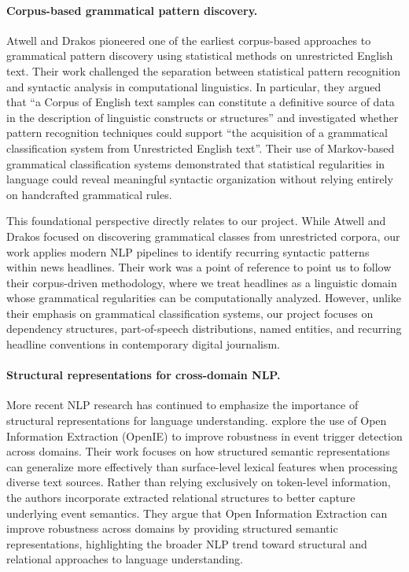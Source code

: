 \documentclass[11pt]{article}
\begin{document}
\paragraph{Corpus-based grammatical pattern discovery.} Atwell and Drakos pioneered one of the earliest corpus-based approaches to grammatical pattern discovery using statistical methods on unrestricted English text. Their work challenged the separation between statistical pattern recognition and syntactic analysis in computational linguistics. In particular, they argued that ``a Corpus of English text samples can constitute a definitive source of data in the description of linguistic constructs or structures'' and investigated whether pattern recognition techniques could support ``the acquisition of a grammatical classification system from Unrestricted English text''. Their use of Markov-based grammatical classification systems demonstrated that statistical regularities in language could reveal meaningful syntactic organization without relying entirely on handcrafted grammatical rules.

This foundational perspective directly relates to our project. While Atwell and Drakos focused on discovering grammatical classes from unrestricted corpora, our work applies modern NLP pipelines to identify recurring syntactic patterns within news headlines. Their work was a point of reference to point us to follow their corpus-driven methodology, where we treat headlines as a linguistic domain whose grammatical regularities can be computationally analyzed. However, unlike their emphasis on grammatical classification systems, our project focuses on dependency structures, part-of-speech distributions, named entities, and recurring headline conventions in contemporary digital journalism.

\paragraph{Structural representations for cross-domain NLP.} More recent NLP research has continued to emphasize the importance of structural representations for language understanding. \citet{dukic-etal-2024-leveraging} explore the use of Open Information Extraction (OpenIE) to improve robustness in event trigger detection across domains. Their work focuses on how structured semantic representations can generalize more effectively than surface-level lexical features when processing diverse text sources. Rather than relying exclusively on token-level information, the authors incorporate extracted relational structures to better capture underlying event semantics. They argue that Open Information Extraction can improve robustness across domains by providing structured semantic representations, highlighting the broader NLP trend toward structural and relational approaches to language understanding.
\end{document}
